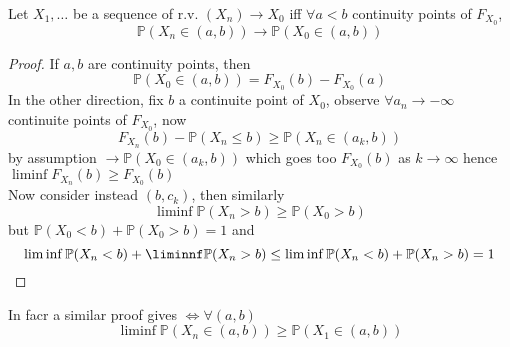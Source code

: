 \documentclass[../main.tex]{subfiles}
\begin{document}
\begin{lemma}
Let $X_1,\ldots$ be a sequence of r.v. $( X_n)\to X_0$ iff $\forall a<b$ continuity points of $F_{X_0} $,
\[ 
\mathbb{P}( X_n\in( a,b) ) \to \mathbb{P}( X_0\in ( a,b) ) 
\]

\end{lemma}
\begin{proof}
If $a,b$ are continuity points, then
\[ 
\mathbb{P}( X_0\in ( a,b) ) = F_{X_0} ( b) - F_{X_0} ( a) 
\]
In the other direction, fix $b$ a continuite point of $X_0$, observe $\forall a_n \to - \infty $ continuite points of $F_{X_0} $, now
\[ 
	F_{X_n} ( b) - \mathbb{P}( X_n \leq b) \geq \mathbb{P}( X_n \in ( a_k,b) ) 
\]
by assumption $\to \mathbb{P}( X_0\in ( a_k,b) ) $ which goes too $F_{X_0} ( b) $ as $k\to \infty $ 	
hence $ \liminf F_{X_n} ( b) \geq  F_{X_0} ( b) $\\
Now consider instead $( b,c_k) $, then similarly
\[ 
\liminf \mathbb{P}( X_n > b) \geq  \mathbb{P}( X_0 >b) 
\]
but $ \mathbb{P}( X_0 < b) + \mathbb{P}( X_0>b) =1$ and
\[ 
\liminf \mathbb{P}( X_n <b) + \liminnf \mathbb{P}( X_n >b) \leq \liminf \mathbb{P}( X_n <b) + \mathbb{P}( X_n >b) =1
\]

\end{proof}
\begin{rmq}
In facr a similar proof gives $\iff \forall ( a,b) $ 
\[ 
\liminf \mathbb{P}( X_n \in ( a,b) ) \geq \mathbb{P}( X_1\in ( a,b) ) 
\]

\end{rmq}
\end{document}
